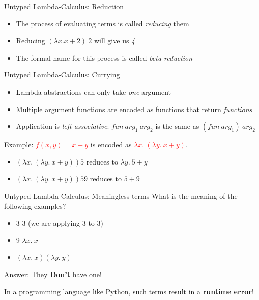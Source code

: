 \documentclass[pdf]{beamer}
\newcommand{\code}[1]{\textcolor{Red}{\textsf{#1}}}
\begin{document}
\begin{frame}{Untyped Lambda-Calculus: Reduction}
  \begin{itemize}
  \item The process of evaluating terms is called \emph{reducing} them
  \item Reducing $(\lambda x. x + 2) \: 2$ will give us \emph{4}
  \item The formal name for this process is called \textit{beta-reduction}
  \end{itemize}
\end{frame}

\begin{frame}{Untyped Lambda-Calculus: Currying}
  \begin{itemize}
  \item Lambda abstractions can only take \emph{one} argument
  \item Multiple argument functions are encoded as functions that return \emph{functions}
  \item Application is \emph{left associative}: $fun \: arg_{1} \: arg_{2}$ is the same as $(fun \: arg_{1}) \: arg_{2}$
  \end{itemize}

  Example: \code{$f(x,y) = x + y$} is encoded as \code{$\lambda x. \: (\lambda y. \: x + y)$}.

  \begin{itemize}
  \item $(\lambda x. \: (\lambda y. \: x + y)) 5$ reduces to $\lambda y. \: 5 + y$
  \item $(\lambda x. \: (\lambda y. \: x + y)) 5 9$ reduces to $5 + 9$
  \end{itemize}

\end{frame}

\begin{frame}{Untyped Lambda-Calculus: Meaningless terms}
  What is the meaning of the following examples?
  \begin{itemize}
  \item 3 3 (we are applying 3 to 3)
  \item 9 $\lambda x. \: x$
  \item $(\lambda x. \: x) (\lambda y. \: y)$
  \end{itemize}
  Answer: They \textbf{Don't} have one!

  In a programming language like Python, such terms result in a \textbf{runtime error}!
\end{frame}
\end{document}
